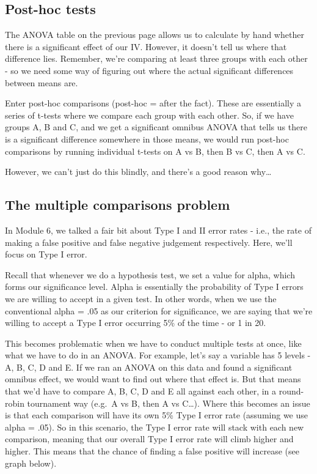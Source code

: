 \documentclass[
]{book}
\begin{document}
\hypertarget{post-hoc-tests}{%
\subsection{Post-hoc tests}\label{post-hoc-tests}}

The ANOVA table on the previous page allows us to calculate by hand
whether there is a significant effect of our IV. However, it doesn't
tell us where that difference lies. Remember, we're comparing at least
three groups with each other - so we need some way of figuring out where
the actual significant differences between means are.

Enter post-hoc comparisons (post-hoc = after the fact). These are
essentially a series of t-tests where we compare each group with each
other. So, if we have groups A, B and C, and we get a significant
omnibus ANOVA that tells us there is a significant difference somewhere
in those means, we would run post-hoc comparisons by running individual
t-tests on A vs B, then B vs C, then A vs C.

However, we can't just do this blindly, and there's a good reason why\ldots{}

\hypertarget{the-multiple-comparisons-problem}{%
\subsection{The multiple comparisons problem}\label{the-multiple-comparisons-problem}}

In Module 6, we talked a fair bit about Type I and II error rates -
i.e., the rate of making a false positive and false negative judgement
respectively. Here, we'll focus on Type I error.

Recall that whenever we do a hypothesis test, we set a value for alpha,
which forms our significance level. Alpha is essentially the probability
of Type I errors we are willing to accept in a given test. In other
words, when we use the conventional alpha = .05 as our criterion for
significance, we are saying that we're willing to accept a Type I error
occurring 5\% of the time - or 1 in 20.

This becomes problematic when we have to conduct multiple tests at once,
like what we have to do in an ANOVA. For example, let's say a variable
has 5 levels - A, B, C, D and E. If we ran an ANOVA on this data and
found a significant omnibus effect, we would want to find out where that
effect is. But that means that we'd have to compare A, B, C, D and E all
against each other, in a round-robin tournament way (e.g.~A vs B, then A
vs C\ldots). Where this becomes an issue is that each comparison will have
its own 5\% Type I error rate (assuming we use alpha = .05). So in this
scenario, the Type I error rate will stack with each new comparison,
meaning that our overall Type I error rate will climb higher and higher.
This means that the chance of finding a false positive will increase
(see graph below).
\end{document}
